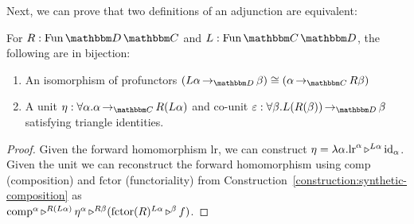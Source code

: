 \documentclass{llncs}
\begin{document}
Next, we can prove that two definitions of an adjunction are
equivalent:
\begin{lemma} \label{lem:adjunction}
  For $R : \varr {\cat D}{\cat C}$ and $L : \varr {\cat
    C}{\cat D}$, the following are in bijection:
  \begin{enumerate}
  \item An isomorphism of profunctors $(\punitinXfromYtoZ {\cat D} {L \alpha}{\beta}) \cong (\punitinXfromYtoZ {\cat C} \alpha {R \beta})$
  \item A unit $\eta : \pendallXdotY \alpha {\punitinXfromYtoZ {\cat C} \alpha
    {R(L\alpha)}}$ and co-unit $\varepsilon: \pendallXdotY \beta
    {\punitinXfromYtoZ {\cat D} {L(R(\beta))}{\beta}}$ satisfying triangle
    identities.
  \end{enumerate}
\end{lemma}
\begin{proof}
  Given the forward homomorphism $\text{lr}$, we can construct $\eta =
  \pendlambdaXdotY \alpha \appunary {\text{lr}} \alpha {\punitrefl
    \alpha} {L \alpha}$.  Given the unit we can reconstruct the
  forward homomorphism using
  $\text{comp}$ (composition) and $\text{fctor}$ (functoriality) from
  Construction~\ref{construction:synthetic-composition} as\\
  $\appbinary {\text{comp}} \alpha
  {\pendappXtoY \eta \alpha} {R(L\alpha)} {(\appunary
    {\text{fctor}(R)}{L \alpha} {f} {\beta})} {R \beta}$.
\end{proof}
\end{document}
